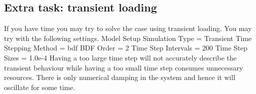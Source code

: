 \subsection*{Extra task: transient loading}

If you have time you may try to solve the case using transient loading. 
You may try with the following settings.
\ttbegin
Model
  Setup 
    Simulation Type = Transient
    Time Stepping Method = bdf
    BDF Order = 2
    Time Step Intervals = 200
    Time Step Sizes = 1.0e-4
\ttend
Having a too large time step will not accurately describe the transient behaviour while having a too 
small time step consumes unnecessary resources. There is only numerical damping in the system and 
hence it will oscillate for some time.

 

\vfill
\mbox{}

